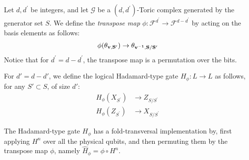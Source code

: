 \begin{definition}
Let $d, d^{\prime}$ be integers, and let $\mathcal{G}$ be a $(d, d^{\prime})$-Toric complex generated by the generator set $S$. We define the \textit{transpose map} $\phi : \mathcal{F}^{d^{\prime}} \rightarrow \mathcal{F}^{d - d^{\prime}}$ by acting on the basis elements as follows:
  \begin{equation*}
    \begin{split}
    \phi(\mathbf{\theta_{v ,S^{\prime}} }) \rightarrow \mathbf{\theta_{v^{-1} ,S/S^{\prime}} } 
    \end{split}
  \end{equation*}
Notice that for $d^{\prime} = d - d^{\prime}$, the transpose map is a permutation over the bits.
\end{definition}

\begin{definition}  
For $ d' = d - d' $, we define the logical Hadamard-type gate $ H_{\phi} \colon L \rightarrow L $ as follows, for any $ S' \subset S $, of size $ d' $:
  \begin{equation*}
    \begin{split}
      H_{\phi} ( X_{S^{\prime}} )  & \rightarrow Z_{S/S^{\prime}} \\
      H_{\phi} ( Z_{S^{\prime}} )  & \rightarrow X_{S/S^{\prime}} 
    \end{split}
  \end{equation*}
\end{definition}
\begin{claim}
The Hadamard-type gate $ H_{\phi} $ has a fold-transversal implementation by, first applying $H^{n}$ over all the physical qubits, and then permuting them by the transpose map $\phi$, namely $\hat{H}_{\phi} = \phi \circ H^{n}$.
\end{claim}
